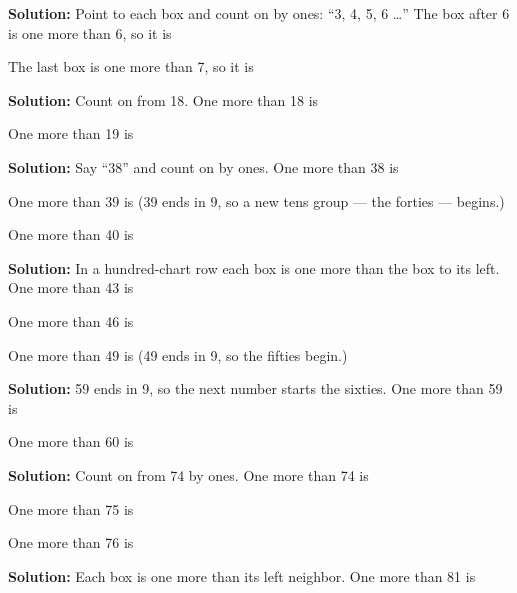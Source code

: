 \documentclass[12pt]{article}
\begin{document}



\textbf{Solution:} Point to each box and count on by ones: ``3, 4, 5, 6 \ldots''
The box after 6 is one more than 6, so it is 

The last box is one more than 7, so it is 


\textbf{Solution:} Count on from 18. One more than 18 is 

One more than 19 is 


\textbf{Solution:} Say ``38'' and count on by ones. One more than 38 is 

One more than 39 is  \quad (39 ends in 9, so a new tens group --- the
forties --- begins.)

One more than 40 is 


\textbf{Solution:} In a hundred-chart row each box is one more than the box to
its left. One more than 43 is 

One more than 46 is 

One more than 49 is  \quad (49 ends in 9, so the fifties begin.)


\textbf{Solution:} 59 ends in 9, so the next number starts the sixties. One
more than 59 is 

One more than 60 is 


\textbf{Solution:} Count on from 74 by ones. One more than 74 is 

One more than 75 is 

One more than 76 is 


\textbf{Solution:} Each box is one more than its left neighbor. One more than
81 is 
\end{document}
